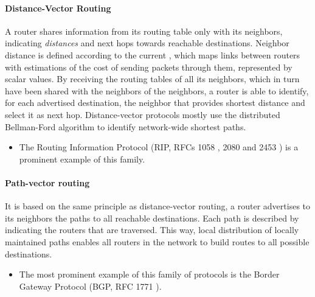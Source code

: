 \paragraph{Distance-Vector Routing} A router shares information from its routing table only with its neighbors, indicating \emph{distances} and next hops towards reachable destinations. Neighbor distance is defined according to the current , which maps links between routers with estimations of the cost of sending packets through them, represented by scalar values. By receiving the routing tables of all its neighbors, which in turn have been shared with the neighbors of the neighbors, a router is able to identify, for each advertised destination, the neighbor that provides shortest distance and select it as next hop. Distance-vector protocols mostly use the distributed Bellman-Ford algorithm \cite{bellman58,ford56} to identify network-wide shortest paths. 
	\begin{itemize}
	\item The Routing Information Protocol (RIP, RFCs 1058 \cite{rfc1058}, 2080 \cite{rfc2080} and 2453 \cite{rfc2453}) is a prominent example of this family.
	\end{itemize}

\paragraph{Path-vector routing} It is based on the same principle as distance-vector routing, a router advertises to its neighbors the paths to all reachable destinations. Each path is described by indicating the routers that are traversed. This way, local distribution of locally maintained paths enables all routers in the network to build routes to all possible destinations. 
	\begin{itemize}
	\item The most prominent example of this family of protocols is the Border Gateway Protocol (BGP, RFC 1771 \cite{rfc1771}). \\
	\end{itemize}

